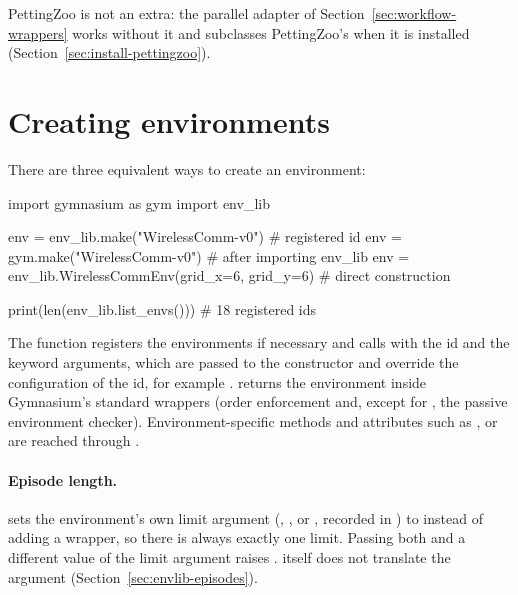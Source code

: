 PettingZoo is not an extra: the parallel adapter of
Section~\ref{sec:workflow-wrappers} works without it and subclasses
PettingZoo's  when it is installed
(Section~\ref{sec:install-pettingzoo}).

\section{Creating environments}\label{sec:envlib-make}

There are three equivalent ways to create an environment:

\begin{pycode}
import gymnasium as gym
import env_lib

env = env_lib.make("WirelessComm-v0")               # registered id
env = gym.make("WirelessComm-v0")                   # after importing env_lib
env = env_lib.WirelessCommEnv(grid_x=6, grid_y=6)   # direct construction

print(len(env_lib.list_envs()))                     # 18 registered ids
\end{pycode}

The function  registers the environments if necessary and
calls  with the id and the keyword arguments, which are
passed to the constructor and override the configuration of the id, for example
.
 returns the environment inside Gymnasium's standard
wrappers (order enforcement and, except for , the passive
environment checker). Environment-specific methods and attributes such as
,  or  are
reached through .

\paragraph{Episode length.} 
sets the environment's own limit argument (,
,  or , recorded in
) to  instead of adding a 
wrapper, so there is always exactly one limit. Passing both
 and a different value of the limit argument raises
.  itself does not translate the
argument (Section~\ref{sec:envlib-episodes}).

